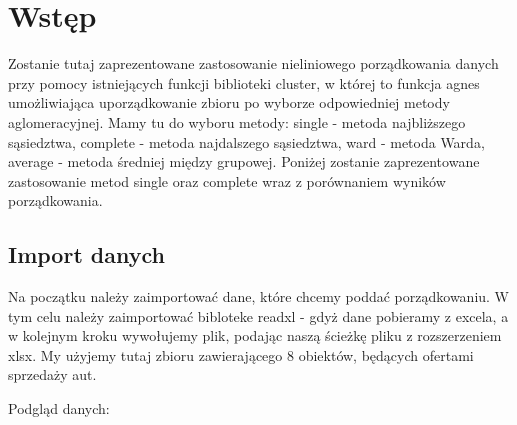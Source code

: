 \documentclass[12pt,a4paper]{report}
\begin{document}
{%

\section{Wstęp}\label{wstep}

Zostanie tutaj zaprezentowane zastosowanie nieliniowego porządkowania
danych przy pomocy istniejących funkcji biblioteki cluster, w której to
funkcja agnes umożliwiająca uporządkowanie zbioru po wyborze
odpowiedniej metody aglomeracyjnej. Mamy tu do wyboru metody: single -
metoda najbliższego sąsiedztwa, complete - metoda najdalszego
sąsiedztwa, ward - metoda Warda, average - metoda średniej między
grupowej. Poniżej zostanie zaprezentowane zastosowanie metod single oraz
complete wraz z porównaniem wyników porządkowania.

\subsection{Import danych}\label{import-danych}

Na początku należy zaimportować dane, które chcemy poddać porządkowaniu.
W tym celu należy zaimportować bibloteke readxl - gdyż dane pobieramy z
excela, a w kolejnym kroku wywołujemy plik, podając naszą ścieżkę pliku
z rozszerzeniem xlsx. My użyjemy tutaj zbioru zawierającego 8 obiektów,
będących ofertami sprzedaży aut.

\begin{Shaded}
\begin{Highlighting}[]
\StringTok{ }\NormalTok{(}\NormalTok{, }
                            \NormalTok{)}
\end{Highlighting}
\end{Shaded}

Podgląd danych:

\begin{Shaded}
\begin{Highlighting}[]
\end{Highlighting}
\end{Shaded}

}
\end{document}
